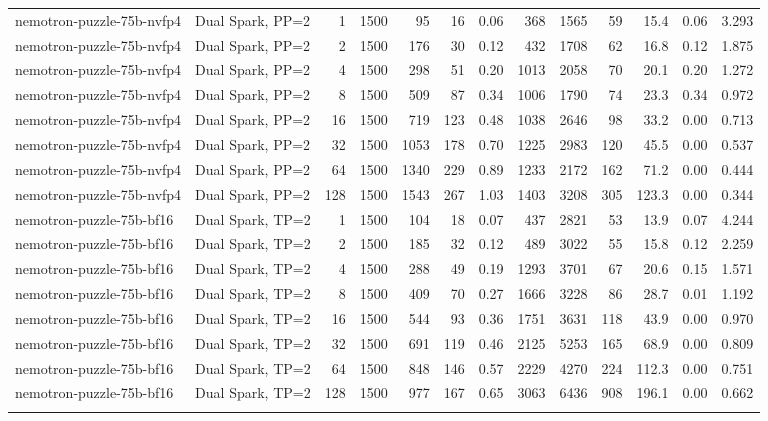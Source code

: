 \begin{tabular}{l l r r r r r r r r r r r}
\addlinespace
nemotron-puzzle-75b-nvfp4 & Dual Spark, PP=2 & 1 & 1500 & 95\rlap{$^\dagger$} & 16 & 0.06 & 368 & 1565 & 59 & 15.4 & 0.06 & 3.293 \\
nemotron-puzzle-75b-nvfp4 & Dual Spark, PP=2 & 2 & 1500 & 176 & 30 & 0.12 & 432 & 1708 & 62 & 16.8 & 0.12 & 1.875 \\
nemotron-puzzle-75b-nvfp4 & Dual Spark, PP=2 & 4 & 1500 & 298 & 51 & 0.20 & 1013 & 2058 & 70 & 20.1 & 0.20 & 1.272 \\
nemotron-puzzle-75b-nvfp4 & Dual Spark, PP=2 & 8 & 1500 & 509 & 87 & 0.34 & 1006 & 1790 & 74 & 23.3 & 0.34 & 0.972 \\
nemotron-puzzle-75b-nvfp4 & Dual Spark, PP=2 & 16 & 1500 & 719 & 123 & 0.48 & 1038 & 2646 & 98 & 33.2 & 0.00 & 0.713 \\
nemotron-puzzle-75b-nvfp4 & Dual Spark, PP=2 & 32 & 1500 & 1053 & 178 & 0.70 & 1225 & 2983 & 120 & 45.5 & 0.00 & 0.537 \\
nemotron-puzzle-75b-nvfp4 & Dual Spark, PP=2 & 64 & 1500 & 1340 & 229 & 0.89 & 1233 & 2172 & 162 & 71.2 & 0.00 & 0.444 \\
nemotron-puzzle-75b-nvfp4 & Dual Spark, PP=2 & 128 & 1500 & 1543 & 267 & 1.03 & 1403 & 3208 & 305 & 123.3 & 0.00 & 0.344 \\
\addlinespace
nemotron-puzzle-75b-bf16 & Dual Spark, TP=2 & 1 & 1500 & 104 & 18 & 0.07 & 437 & 2821 & 53 & 13.9 & 0.07 & 4.244 \\
nemotron-puzzle-75b-bf16 & Dual Spark, TP=2 & 2 & 1500 & 185 & 32 & 0.12 & 489 & 3022 & 55 & 15.8 & 0.12 & 2.259 \\
nemotron-puzzle-75b-bf16 & Dual Spark, TP=2 & 4 & 1500 & 288 & 49 & 0.19 & 1293 & 3701 & 67 & 20.6 & 0.15 & 1.571 \\
nemotron-puzzle-75b-bf16 & Dual Spark, TP=2 & 8 & 1500 & 409 & 70 & 0.27 & 1666 & 3228 & 86 & 28.7 & 0.01 & 1.192 \\
nemotron-puzzle-75b-bf16 & Dual Spark, TP=2 & 16 & 1500 & 544 & 93 & 0.36 & 1751 & 3631 & 118 & 43.9 & 0.00 & 0.970 \\
nemotron-puzzle-75b-bf16 & Dual Spark, TP=2 & 32 & 1500 & 691 & 119 & 0.46 & 2125 & 5253 & 165 & 68.9 & 0.00 & 0.809 \\
nemotron-puzzle-75b-bf16 & Dual Spark, TP=2 & 64 & 1500 & 848 & 146 & 0.57 & 2229 & 4270 & 224 & 112.3 & 0.00 & 0.751 \\
nemotron-puzzle-75b-bf16 & Dual Spark, TP=2 & 128 & 1500 & 977 & 167 & 0.65 & 3063 & 6436 & 908 & 196.1 & 0.00 & 0.662 \\
\addlinespace

\end{tabular}
